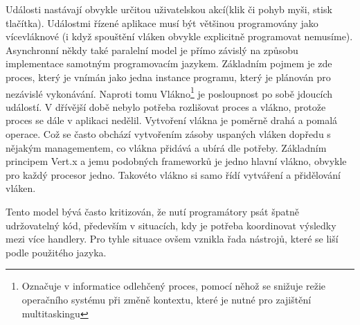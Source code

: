 Události nastávají obvykle určitou uživatelskou akcí(klik či pohyb myši, stisk tlačítka).
Událostmi řízené aplikace musí být většinou programovány jako vícevláknové (i když spouštění vláken obvykle explicitně programovat nemusíme).
Asynchronní někdy také paralelní model je přímo závislý na způsobu implementace samotným programovacím jazykem. Základním pojmem je zde proces, který je vnímán jako jedna instance programu, který je plánován pro nezávislé vykonávání. Naproti tomu Vlákno\footnote{Označuje v informatice odlehčený proces, pomocí něhož se snižuje režie operačního systému při změně kontextu, které je nutné pro zajištění multitaskingu} je posloupnost po sobě jdoucích událostí. V dřívější době nebylo potřeba rozlišovat proces a vlákno, protože proces se dále v aplikaci nedělil. Vytvoření vlákna je poměrně drahá a pomalá operace. Což se často obchází vytvořením zásoby uspaných vláken dopředu s nějakým managementem, co vlákna přidává a ubírá dle potřeby. Základním principem Vert.x a jemu podobných frameworků je jedno hlavní vlákno, obvykle pro každý procesor jedno. Takovéto vlákno si samo řídí vytváření a přidělování vláken.

Tento model bývá často kritizován, že nutí programátory psát špatně udržovatelný kód, především v situacích, kdy je potřeba koordinovat výsledky mezi více handlery. Pro tyhle situace ovšem vznikla řada nástrojů, které se liší podle použitého jazyka.

